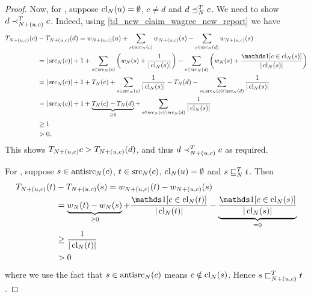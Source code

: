 \begin{proof}
    Now, for \freshposresp, suppose $\operatorname{cl}_N(u) = \emptyset$, $c \ne d$ and
    $d \preceq_N^T c$. We need to show $d \prec_{{N} + ({u}, {c})}^T c$. Indeed,
    using \cref{td_new_claim_wagree_new_report} we have
    \begin{align*}
        T_{\addclaim{N}{u}{c}}(c) &- T_{\addclaim{N}{u}{c}}(d)
        = w_{\addclaim{N}{u}{c}}(u)
        + \sum_{s \in \src_N(c)}{
            w_{\addclaim{N}{u}{c}}(s)
        }
        - \sum_{s \in \src_N(d)}{
            w_{\addclaim{N}{u}{c}}(s)
        } \\
        &= |\src_N(c)| + 1
        + \sum_{s \in \src_N(c)}{
            \left(
                w_N(s)
                + \frac{1}{|\claims_N(s)|}
            \right)
        }
        - \sum_{s \in \src_N(d)}{
            \left(
                w_N(s)
                + \frac{\indicator{c \in \claims_N(s)}}{|\claims_N(s)|}
            \right)
        } \\
        &= |\src_N(c)| + 1
        + T_N(c)
        + \sum_{s \in \src_N(c)}{
            \frac{1}{|\claims_N(s)|}
        }
        - T_N(d)
        - \sum_{s \in \src_N(c) \cap \src_N(d)}{
            \frac{1}{|\claims_N(s)|}
        } \\
        &= |\src_N(c)| + 1
        + \underbrace{T_N(c) - T_N(d)}_{\ge 0}
        + \sum_{s \in \src_N(c) \setminus \src_N(d)}{
            \frac{1}{|\claims_N(s)|}
        } \\
        &\ge 1 \\
        & > 0.
    \end{align*}
    This shows $T_{{N} + ({u}, {c})}{c} > T_{{N} + ({u}, {c})}(d)$, and
    thus $d \prec_{{N} + ({u}, {c})}^T c$ as required.

    For \sourceposresp{}, suppose $s \in \operatorname{antisrc}_N(c)$, $t \in \operatorname{src}_N(c)$,
    $\operatorname{cl}_N(u) = \emptyset$ and $s \sqsubseteq_N^T t$. Then
    \begin{align*}
        T_{\addclaim{N}{u}{c}}(t) &- T_{\addclaim{N}{u}{c}}(s)
        = w_{\addclaim{N}{u}{c}}(t) - w_{\addclaim{N}{u}{c}}(s) \\
        &= \underbrace{w_N(t) - w_N(s)}_{\ge 0}
        + \frac{\indicator{c \in \claims_N(t)}}{|\claims_N(t)|}
        - \underbrace{
            \frac{\indicator{c \in \claims_N(s)}}{|\claims_N(s)|}
        }_{= 0} \\
        &\ge \frac{1}{|\claims_N(t)|} \\
        &> 0
    \end{align*}
    where we use the fact that $s \in \operatorname{antisrc}_N(c)$ means $c \notin
    \operatorname{cl}_N(s)$. Hence $s \sqsubset_{{N} + ({u}, {c})}^T t$.


\end{proof}
